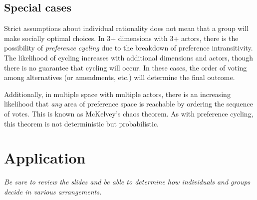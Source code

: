 \documentclass[10pt]{article}
\begin{document}
	\subsection{Special cases}
	
	Strict assumptions about individual rationality does not mean that a group will make socially optimal choices. In 3+ dimensions with 3+ actors, there is the possibility of \textit{preference cycling} due to the breakdown of preference intransitivity. The likelihood of cycling increases with additional dimensions and actors, though there is no guarantee that cycling will occur. In these cases, the order of voting among alternatives (or amendments, etc.) will determine the final outcome.
	
	Additionally, in multiple space with multiple actors, there is an increasing likelihood that \textit{any} area of preference space is reachable by ordering the sequence of votes. This is known as McKelvey's chaos theorem. As with preference cycling, this theorem is not deterministic but probabilistic. 
	
	
	
	\section{Application}
	
	\textit{Be sure to review the slides and be able to determine how individuals and groups decide in various arrangements.}
	
	
\end{document}
